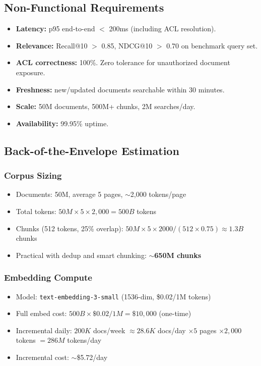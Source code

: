 \subsection*{Non-Functional Requirements}

\begin{itemize}
  \item \textbf{Latency:} p95 end-to-end $<$ 200ms (including ACL resolution).
  \item \textbf{Relevance:} Recall@10 $>$ 0.85, NDCG@10 $>$ 0.70 on benchmark query set.
  \item \textbf{ACL correctness:} 100\%. Zero tolerance for unauthorized document exposure.
  \item \textbf{Freshness:} new/updated documents searchable within 30 minutes.
  \item \textbf{Scale:} 50M documents, 500M+ chunks, 2M searches/day.
  \item \textbf{Availability:} 99.95\% uptime.
\end{itemize}

\subsection*{Back-of-the-Envelope Estimation}

\subsubsection*{Corpus Sizing}

\begin{itemize}
  \item Documents: 50M, average 5 pages, $\sim$2,000 tokens/page
  \item Total tokens: $50M \times 5 \times 2{,}000 = 500B$ tokens
  \item Chunks (512 tokens, 25\% overlap): $50M \times 5 \times 2000 / (512 \times 0.75) \approx 1.3B$ chunks
  \item Practical with dedup and smart chunking: \textbf{$\sim$650M chunks}
\end{itemize}

\subsubsection*{Embedding Compute}

\begin{itemize}
  \item Model: \texttt{text-embedding-3-small} (1536-dim, \$0.02/1M tokens)
  \item Full embed cost: $500B \times \$0.02/1M = \$10{,}000$ (one-time)
  \item Incremental daily: $200K$ docs/week $\approx 28.6K$ docs/day $\times 5$ pages $\times 2{,}000$ tokens $= 286M$ tokens/day
  \item Incremental cost: $\sim$\$5.72/day
\end{itemize}

